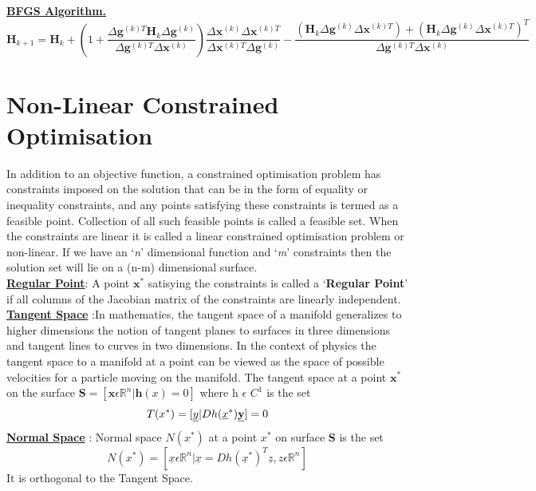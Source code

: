 \documentclass[12pt,a4paper,titlepage]{article}
\begin{document}
\textbf{\underline{BFGS Algorithm.}}
\begin{equation}
    \textbf{H}_{k+1}= \textbf{H}_{k}+ (1+\frac{\Delta \textbf{g}^{(k)T}\textbf{H}_{k}\Delta\textbf{g}^{(k)}}{\Delta\textbf{g}^{(k)T}\Delta\textbf{x}^{(k)}})\frac{\Delta\textbf{x}^{(k)}\Delta\textbf{x}^{(k)T}}{\Delta\textbf{x}^{(k)T}\Delta\textbf{g}^{(k)}} - \frac{(\textbf{H}_{k}\Delta\textbf{g}^{(k)}\Delta\textbf{x}^{(k)T})+(\textbf{H}_{k}\Delta\textbf{g}^{(k)}\Delta\textbf{x}^{(k)T})^{T}}{\Delta\textbf{g}^{(k)T}\Delta\textbf{x}^{(k)}}
\end{equation}

\section{Non-Linear Constrained Optimisation}
In addition to an objective function, a constrained optimisation problem has constraints imposed on the solution that can be in the form of equality or inequality constraints, and any points satisfying these constraints is termed as a feasible point. Collection of all such feasible points is called a feasible set. When the constraints are linear it is called a linear constrained optimisation problem or non-linear. If we have an `\textit{n}' dimensional function and `\textit{m}' constraints then the solution set will lie on a (n-m) dimensional surface.\\[1\baselineskip]
\textbf{\underline{Regular Point}}: A point $\textbf{x}^{*}$ satisying the constraints is called a `\textbf{Regular Point}' if all columns of the Jacobian matrix of the constraints are linearly independent.\cite{regularpoint}\\ 
\textbf{\underline{Tangent Space}} :In mathematics, the tangent space of a manifold generalizes to higher dimensions the notion of tangent planes to surfaces in three dimensions and tangent lines to curves in two dimensions. In the context of physics the tangent space to a manifold at a point can be viewed as the space of possible velocities for a particle moving on the manifold. \cite{tangentspace} The tangent space at a point $\textbf{x}^{*}$ on the surface $\textbf{S}= [\textbf{x}\epsilon \mathbb{R}^{n} | \textbf{h}(x)=0]$ where h $\epsilon$ $C^{1}$ is the set
\begin{equation}
    T(x^{*})= [\underline{y} | Dh(\underline{x}^{*})\textbf{\underline{y}}]= 0
\end{equation}
\textbf{\underline{Normal Space}} : Normal space $N(x^{*})$ at a point $x^{*}$ on surface \textbf{S} is the set
\begin{equation}
    N(x^{*})= [\underline{x} \epsilon \mathbb{R}^{n} | \underline{x} = Dh(\underline{x}^{*})^{T}\underline{z}, z \epsilon \mathbb{R}^{n}]
\end{equation}
It is orthogonal to the Tangent Space. \cite{normalspace}
\end{document}
